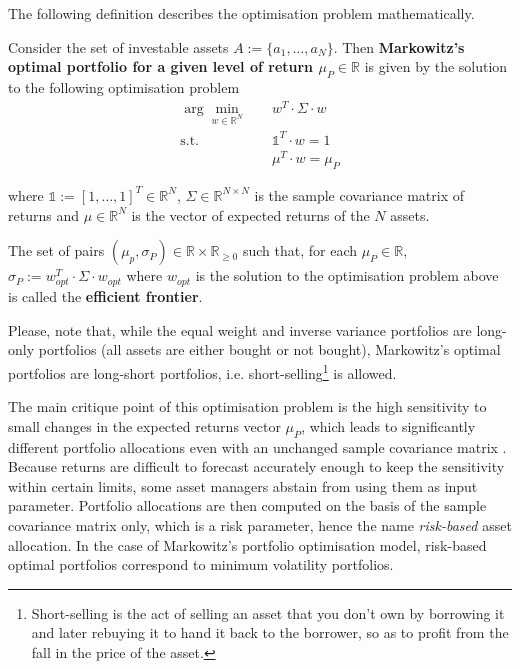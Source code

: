     The following definition describes the optimisation problem mathematically.
    \begin{definition}
        Consider the set of investable assets $A := \{ a_1, \dots, a_N \}$. Then \textbf{Markowitz's optimal portfolio for a given level of return $\mu_P \in \mathbb{R}$} is given by the solution to the following optimisation problem
        \begin{align*}
            \arg \min_{w \in \mathbb{R}^N}& \quad w^T \cdot \Sigma \cdot w \\
            \text{s.t.}& \quad \mathds{1}^T \cdot w = 1 \\
            & \quad \mu^T \cdot w = \mu_P
        \end{align*}
        
        where $\mathds{1} := [ 1, \dots, 1]^T \in \mathbb{R}^N$, $\Sigma \in \mathbb{R}^{N \times N}$ is the sample covariance matrix of returns and $\mu \in \mathbb{R}^N$ is the vector of expected returns of the $N$ assets.
        
        The set of pairs $(\mu_p, \sigma_P) \in \mathbb{R} \times \mathbb{R}_{\geq 0}$ such that, for each $\mu_P \in \mathbb{R}$, $\sigma_P := w_{opt}^T \cdot \Sigma \cdot w_{opt}$ where $w_{opt}$ is the solution to the optimisation problem above is called the \textbf{efficient frontier}.
    \end{definition}
	
	Please, note that, while the equal weight and inverse variance portfolios are long-only portfolios (all assets are either bought or not bought), Markowitz's optimal portfolios are long-short portfolios, i.e. short-selling\footnote{Short-selling is the act of selling an asset that you don't own by borrowing it and later rebuying it to hand it back to the borrower, so as to profit from the fall in the price of the asset.} is allowed.
    
    The main critique point of this optimisation problem is the high sensitivity to small changes in the expected returns vector $\mu_P$, which leads to significantly different portfolio allocations even with an unchanged sample covariance matrix \cite{michaudreturnsstability}. Because returns are difficult to forecast accurately enough to keep the sensitivity within certain limits, some asset managers abstain from using them as input parameter. Portfolio allocations are then computed on the basis of the sample covariance matrix only, which is a risk parameter, hence the name \textit{risk-based} asset allocation. In the case of Markowitz's portfolio optimisation model, risk-based optimal portfolios correspond to minimum volatility portfolios.
    

